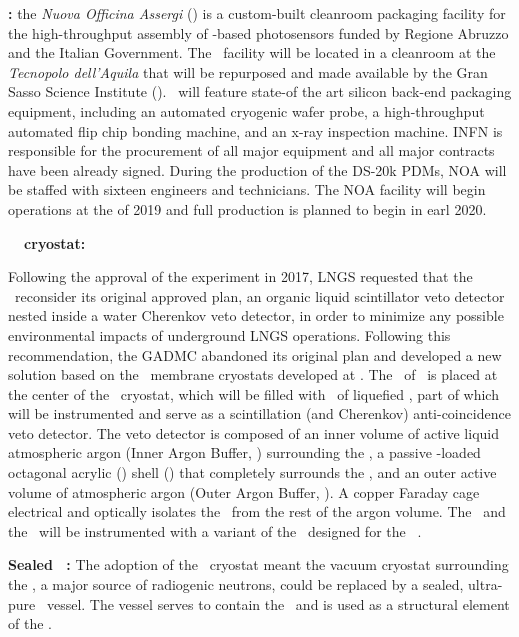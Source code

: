 \begin{asparaenum}
\item[\bf \NOA:]
the {\it Nuova Officina Assergi} (\NOA) is a custom-built cleanroom packaging facility for the high-throughput assembly of \SiPM-based photosensors funded by Regione Abruzzo and the Italian Government.  The \NOA\ facility will be located in a cleanroom at the {\it Tecnopolo dell'Aquila} that will be repurposed and made available by the Gran Sasso Science Institute (\GSSI).  \NOA\ will feature state-of the art silicon back-end packaging equipment, including an automated cryogenic wafer probe, a high-throughput automated flip chip bonding machine, and an x-ray inspection machine.  INFN is responsible for the procurement of all major equipment and all major contracts have been already signed. During the production of the DS-20k PDMs, NOA will be staffed with sixteen engineers and technicians. The NOA facility will begin operations at the of 2019 and full production is planned to begin in earl 2020.

\item[\bf \pDUNE\ \LAr\ cryostat:]

Following the approval of the experiment in 2017, LNGS requested that the \GADMC\ reconsider its original approved plan, an organic liquid scintillator veto detector nested inside a water Cherenkov veto detector, in order to minimize any possible environmental impacts of underground LNGS operations. Following this recommendation, the GADMC abandoned its original plan and developed a new solution based on the \pDUNE\ membrane cryostats developed at \CERN. The \LArTPC\ of \DSks\ is placed at the center of the \pDUNE\ cryostat, which will be filled with \pDUNELArMass\ of liquefied \AAr, part of which will be instrumented and serve as a scintillation (and Cherenkov) anti-coincidence veto detector.  The veto detector is composed of an inner volume of active liquid atmospheric argon (Inner Argon Buffer, \IAB) surrounding the \TPC, a passive -loaded octagonal acrylic (\PMMA) shell (\GdAS) that completely surrounds the \IAB, and an outer active volume of atmospheric argon (Outer Argon Buffer, \OAB). A copper Faraday cage electrical and optically isolates the \OAB\ from the rest of the argon volume.  The \IAB\ and the \OAB\ will be instrumented with a variant of the \DSkPdms\ designed for the \DSks\ \LArTPC.

\item[\bf Sealed \PMMA\ \TPC:]
The adoption of the \pDUNE\ cryostat meant the vacuum cryostat surrounding the \LArTPC, a major source of radiogenic neutrons, could be replaced by a sealed, ultra-pure \PMMA\ vessel. The vessel serves to contain the \UAr\ and is used as a structural element of the \TPC.

\end{asparaenum}


